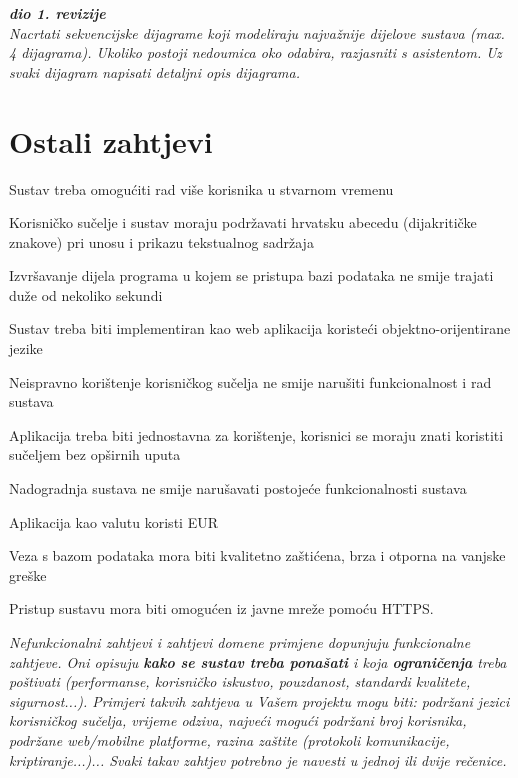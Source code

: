 				\textbf{\textit{dio 1. revizije}}\\
				
				\textit{Nacrtati sekvencijske dijagrame koji modeliraju najvažnije dijelove sustava (max. 4 dijagrama). Ukoliko postoji nedoumica oko odabira, razjasniti s asistentom. Uz svaki dijagram napisati detaljni opis dijagrama.}
				\eject
	
		\section{Ostali zahtjevi}
		
			\begin{packed_item}
				\item Sustav treba omogućiti rad više korisnika u stvarnom vremenu
				\item Korisničko sučelje i sustav moraju podržavati hrvatsku abecedu (dijakritičke znakove) pri unosu i prikazu tekstualnog sadržaja
				\item Izvršavanje dijela programa u kojem se pristupa bazi podataka ne smije trajati duže od nekoliko sekundi
				\item Sustav treba biti implementiran kao web aplikacija koristeći objektno-orijentirane jezike
				\item Neispravno korištenje korisničkog sučelja ne smije narušiti funkcionalnost i rad sustava
				\item Aplikacija treba biti jednostavna za korištenje, korisnici se moraju znati koristiti sučeljem bez opširnih uputa
				\item Nadogradnja sustava ne smije narušavati postojeće funkcionalnosti sustava
				\item Aplikacija kao valutu koristi EUR
				\item Veza s bazom podataka mora biti kvalitetno zaštićena, brza i otporna na vanjske greške
				\item Pristup sustavu mora biti omogućen iz javne mreže pomoću HTTPS.
			\end{packed_item}
			
		 
			 \textit{Nefunkcionalni zahtjevi i zahtjevi domene primjene dopunjuju funkcionalne zahtjeve. Oni opisuju \textbf{kako se sustav treba ponašati} i koja \textbf{ograničenja} treba poštivati (performanse, korisničko iskustvo, pouzdanost, standardi kvalitete, sigurnost...). Primjeri takvih zahtjeva u Vašem projektu mogu biti: podržani jezici korisničkog sučelja, vrijeme odziva, najveći mogući podržani broj korisnika, podržane web/mobilne platforme, razina zaštite (protokoli komunikacije, kriptiranje...)... Svaki takav zahtjev potrebno je navesti u jednoj ili dvije rečenice.}
			 
			 
			 
	